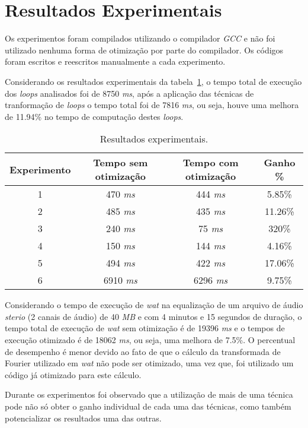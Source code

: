 \section{Resultados Experimentais}

Os experimentos foram compilados utilizando o compilador \textit{GCC} e não foi
utilizado nenhuma forma de otimização por parte do compilador.
Os códigos foram escritos e reescritos manualmente a cada experimento.

Considerando os resultados experimentais da tabela~\ref{tabela_resultados},
o tempo total de execução dos \textit{loops} analisados foi de 8750 \textit{ms},
após a aplicação das técnicas de tranformação de \textit{loops} o tempo total
foi de 7816 \textit{ms}, ou seja, houve uma melhora de 11.94\% no tempo de  
computação destes \textit{loops}.

\begin{table}[ht]
  \label{tabela_resultados}
\begin{center}
  \begin{tabular}{|c|c|c|c|}
    \hline
    \textbf{Experimento} & \textbf{Tempo sem otimização} & \textbf{Tempo com
          otimização} & \textbf{Ganho} \%\\
    \hline
    1 & 470 \textit{ms} & 444 \textit{ms} & 5.85\% \\
    \hline
    2 & 485 \textit{ms} & 435 \textit{ms} & 11.26\% \\
    \hline
    3 & 240 \textit{ms} & 75 \textit{ms} & 320\% \\
    \hline
    4 & 150 \textit{ms} & 144 \textit{ms} & 4.16\% \\
    \hline
    5 & 494 \textit{ms} & 422 \textit{ms} & 17.06\% \\
    \hline
    6 & 6910 \textit{ms} & 6296 \textit{ms} & 9.75\% \\
    \hline
  \end{tabular}
  \caption{Resultados experimentais.}
\end{center}
\end{table}

Considerando o tempo de execução de \textit{wat} na equalização de um
arquivo de áudio \textit{sterio} (2 canais de áudio) de 40 \textit{MB} e
com 4 minutos e 15 segundos de duração, o tempo total de execução de \textit{wat} 
sem otimização é de 19396 \textit{ms} 
e o tempos de execução otimizado é de 18062 \textit{ms}, ou seja, uma melhora de 
7.5\%. 
O percentual de desempenho é menor devido ao fato de que o cálculo da
transformada de Fourier \cite{fft} utilizado em \textit{wat} não pode ser otimizado, uma
vez que, foi utilizado um código já otimizado para este cálculo.

Durante os experimentos foi observado que a utilização de mais de uma técnica
pode não só obter o ganho individual de cada uma das técnicas, como também 
potencializar os resultados uma das outras.

